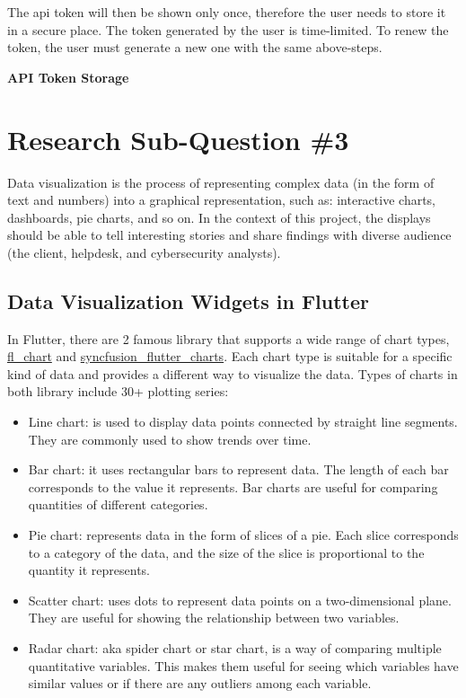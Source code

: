 \begin{multicols}{2}
      The \acrshort{api} token will then be shown only once, therefore the user needs to store it in a secure place. The token
      generated by the user is time-limited. To renew the token, the user must generate a new one with the same above-steps.

      \textbf{API Token Storage}

      \section{Research Sub-Question \#3}
      Data visualization is the process of representing complex data (in the form of text and numbers) into a graphical representation,
      such as: interactive charts, dashboards, pie charts, and so on. In the context of this project, the displays should be able to tell
      interesting stories and share findings with diverse audience (the client, helpdesk, and cybersecurity analysts).

      \subsection{Data Visualization Widgets in Flutter}
      In Flutter, there are 2 famous library that supports a wide range of chart types, \href{https://pub.dev/packages/fl_chart}{fl\_chart}
      and \href{https://pub.dev/packages/syncfusion_flutter_charts}{syncfusion\_flutter\_charts}. Each chart type is suitable for a
      specific kind of data and provides a different way to visualize the data. Types of charts in both library include 30+ plotting series:
      \begin{itemize}
            \item Line chart: is used to display data points connected by straight line segments. They are commonly used to show trends
                  over time.
            \item Bar chart: it uses rectangular bars to represent data. The length of each bar corresponds to the value it represents.
                  Bar charts are useful for comparing quantities of different categories.
            \item Pie chart: represents data in the form of slices of a pie. Each slice corresponds to a category of the data, and the
                  size of the slice is proportional to the quantity it represents.
            \item Scatter chart: uses dots to represent data points on a two-dimensional plane. They are useful for showing the
                  relationship between two variables.
            \item Radar chart: \acrshort{aka} spider chart or star chart, is a way of comparing multiple quantitative variables. This
                  makes them useful for seeing which variables have similar values or if there are any outliers among each variable.
      \end{itemize}
\end{multicols}

